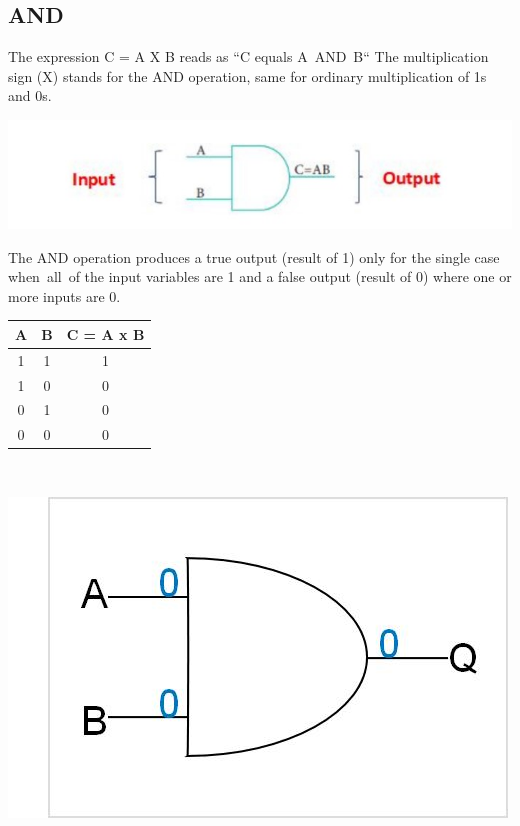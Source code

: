\documentclass{article}
\begin{document}
\subsection{AND}
The expression C = A X B reads as “C equals A AND B“ 
The multiplication sign (X) stands for the AND operation, same for ordinary multiplication of 1s and 0s.\\
\begin{center}
	\includegraphics{pic4}
\end{center}

The AND operation produces a true output (result of 1) only for the single case when all of the input variables are 1 and a false output (result of 0) where one or more inputs are 0. \\
\begin{table}[h!]
	\begin{center}
		\begin{tabular}{c|c|c}
			\textbf{A} & \textbf{B} &
			\textbf{C = A x B}\\
			\hline
			\cellcolor{blue!20}1 & \cellcolor{blue!20}1 & \cellcolor{blue!20}1\\
			\hline
			\cellcolor{blue!30}1 & \cellcolor{blue!30}0 & \cellcolor{blue!30}0\\
			\hline
			\cellcolor{blue!20}0 & \cellcolor{blue!20}1 & \cellcolor{blue!20}0\\
			\hline
			\cellcolor{blue!30}0 & \cellcolor{blue!30}0 & \cellcolor{blue!30}0\\
			\hline
		\end{tabular}
	\end{center}
\end{table} \\
\begin{center}
	\includegraphics{pic6}
\end{center} 
\end{document}
